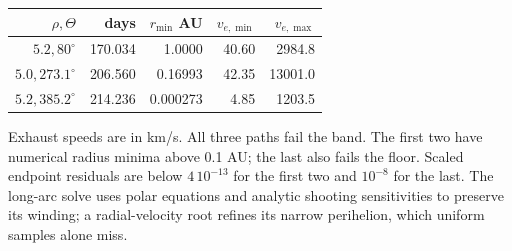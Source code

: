 \begin{center}\small
\begin{tabular}{rrrrr}\toprule
$\rho,\Theta$&days&$r_{\min}$ AU&$v_{e,\min}$&$v_{e,\max}$\\\midrule
$5.2,80^\circ$&170.034&1.0000&40.60&2984.8\\
$5.0,273.1^\circ$&206.560&0.16993&42.35&13001.0\\
$5.2,385.2^\circ$&214.236&0.000273&4.85&1203.5\\\bottomrule
\end{tabular}\end{center}
Exhaust speeds are in km/s. All three paths fail the band. The first two
have numerical radius minima above 0.1 AU; the last also fails the floor.
Scaled endpoint residuals are below $4\,10^{-13}$ for the first two and
$10^{-8}$ for the last. The long-arc solve uses polar equations and
analytic shooting sensitivities to preserve its winding; a radial-velocity
root refines its narrow perihelion, which uniform samples alone miss.
